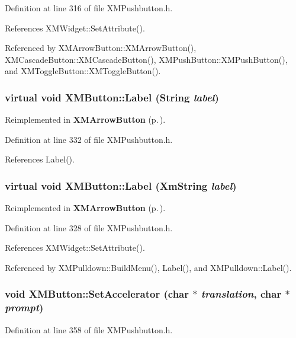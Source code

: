 Definition at line 316 of file XMPushbutton.h.

References XMWidget::Set\-Attribute().

Referenced by XMArrow\-Button::XMArrow\-Button(), XMCascade\-Button::XMCascade\-Button(), XMPush\-Button::XMPush\-Button(), and XMToggle\-Button::XMToggle\-Button().
\subsubsection{\setlength{\rightskip}{0pt plus 5cm}virtual void XMButton::Label (String {\em label})\hspace{0.3cm}{\tt  [inline, virtual]}}\label{classXMButton_a3}




Reimplemented in {\bf XMArrow\-Button} {\rm (p.\,\pageref{classXMArrowButton_a9})}.

Definition at line 332 of file XMPushbutton.h.

References Label().
\subsubsection{\setlength{\rightskip}{0pt plus 5cm}virtual void XMButton::Label (Xm\-String {\em label})\hspace{0.3cm}{\tt  [inline, virtual]}}\label{classXMButton_a2}




Reimplemented in {\bf XMArrow\-Button} {\rm (p.\,\pageref{classXMArrowButton_a8})}.

Definition at line 328 of file XMPushbutton.h.

References XMWidget::Set\-Attribute().

Referenced by XMPulldown::Build\-Menu(), Label(), and XMPulldown::Label().
\subsubsection{\setlength{\rightskip}{0pt plus 5cm}void XMButton::Set\-Accelerator (char $\ast$ {\em translation}, char $\ast$ {\em prompt})\hspace{0.3cm}{\tt  [inline]}}\label{classXMButton_a8}




Definition at line 358 of file XMPushbutton.h.


